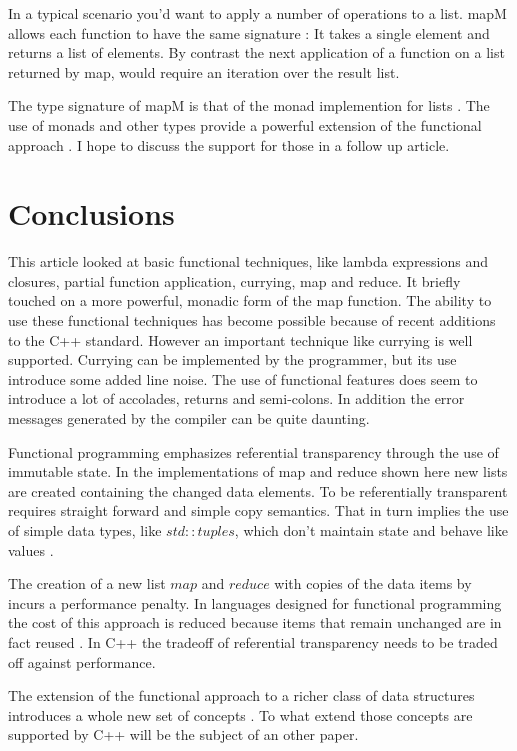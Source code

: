 \documentclass[12pt,fleqn]{article}
\begin{document}
In a typical scenario you'd want to apply a number of operations to a list.
mapM allows each function to have the same signature : It takes a single element and returns a list of elements.
By contrast the next application of a function on a list returned by map, would require an iteration over the result list.

The type signature of mapM is that of the monad implemention for lists \cite{bird, lipovaca}.
The use of monads and other types provide a powerful extension of the functional approach \cite{yorgey}.
I hope to discuss the support for those in a follow up article.

\section*{Conclusions}
%
This article looked at basic functional techniques, like lambda expressions and closures, partial function application, currying, map and reduce.
It briefly touched on a more powerful, monadic form of the map function.
The ability to use these functional techniques has become possible because of recent additions to the C++ standard.
However an important technique like currying is well supported.
Currying can be implemented by the programmer, but its use introduce some added line noise.
The use of functional features does seem to introduce a lot of accolades, returns and semi-colons.
In addition the error messages generated by the compiler can be quite daunting.

Functional programming emphasizes referential transparency through the use of immutable state.
In the implementations of map and reduce shown here new lists are created containing the changed data elements.
To be referentially transparent requires straight forward and simple copy semantics.
That in turn implies the use of simple data types, like $std::tuples$, which don't maintain state and behave like values \cite{tuples}.

The creation of a new list  $map$ and $reduce$ with copies of the data items by incurs a performance penalty.
In languages designed for functional programming the cost of this approach is reduced because items that remain unchanged are in fact reused \cite{field}. 
In C++ the tradeoff of referential transparency needs to be traded off against performance.

The extension of the functional approach to a richer class of data structures introduces a whole new set of concepts \cite{bird,lipovaca,yorgey}.
To what extend those concepts are supported by C++ will be the subject of an other paper.
\end{document}
